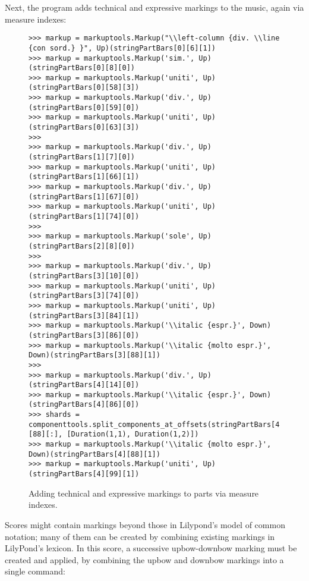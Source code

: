 Next, the program adds technical and expressive markings to the music, again via measure indexes:

\begin{figure}[H] 
\begin{lstlisting}[basicstyle=\scriptsize\ttfamily, breaklines=True, tabsize=4, showtabs=false, showspaces=false]
>>> markup = markuptools.Markup("\\left-column {div. \\line {con sord.} }", Up)(stringPartBars[0][6][1])
>>> markup = markuptools.Markup('sim.', Up)(stringPartBars[0][8][0])
>>> markup = markuptools.Markup('uniti', Up)(stringPartBars[0][58][3])
>>> markup = markuptools.Markup('div.', Up)(stringPartBars[0][59][0])
>>> markup = markuptools.Markup('uniti', Up)(stringPartBars[0][63][3])
>>> 
>>> markup = markuptools.Markup('div.', Up)(stringPartBars[1][7][0])
>>> markup = markuptools.Markup('uniti', Up)(stringPartBars[1][66][1])
>>> markup = markuptools.Markup('div.', Up)(stringPartBars[1][67][0])
>>> markup = markuptools.Markup('uniti', Up)(stringPartBars[1][74][0])
>>> 
>>> markup = markuptools.Markup('sole', Up)(stringPartBars[2][8][0])
>>> 
>>> markup = markuptools.Markup('div.', Up)(stringPartBars[3][10][0])
>>> markup = markuptools.Markup('uniti', Up)(stringPartBars[3][74][0])
>>> markup = markuptools.Markup('uniti', Up)(stringPartBars[3][84][1])
>>> markup = markuptools.Markup('\\italic {espr.}', Down)(stringPartBars[3][86][0])
>>> markup = markuptools.Markup('\\italic {molto espr.}', Down)(stringPartBars[3][88][1])
>>> 
>>> markup = markuptools.Markup('div.', Up)(stringPartBars[4][14][0])
>>> markup = markuptools.Markup('\\italic {espr.}', Down)(stringPartBars[4][86][0])
>>> shards = componenttools.split_components_at_offsets(stringPartBars[4][88][:], [Duration(1,1), Duration(1,2)]) 
>>> markup = markuptools.Markup('\\italic {molto espr.}', Down)(stringPartBars[4][88][1])
>>> markup = markuptools.Markup('uniti', Up)(stringPartBars[4][99][1])\end{lstlisting}

\caption{Adding technical and expressive markings to parts via measure indexes. } 
\end{figure}

Scores might contain markings beyond those in Lilypond's model of common notation; many of them can be created by combining existing markings in LilyPond's lexicon. In this score, a successive upbow-downbow marking must be created and applied, by combining the upbow and downbow markings into a single command:

